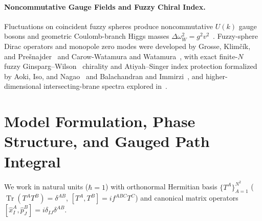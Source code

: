 \documentclass[11pt,a4paper]{article}
\DeclareMathOperator{\Tr}{Tr}
\begin{document}
\paragraph{Noncommutative Gauge Fields and Fuzzy Chiral Index.}
Fluctuations on coincident fuzzy spheres produce noncommutative $U(k)$ gauge bosons and geometric Coulomb-branch Higgs masses $\Delta\omega_W^2 = g^2 v^2$~\cite{Iso2001}. Fuzzy-sphere Dirac operators and monopole zero modes were developed by Grosse, Klim\v{c}\'ik, and Pre\v{s}najder~\cite{Grosse1996} and Carow-Watamura and Watamura~\cite{CarowWatamura1997}, with exact finite-$N$ fuzzy Ginsparg--Wilson~\cite{Ginsparg1982} chirality and Atiyah--Singer index protection formalized by Aoki, Iso, and Nagao~\cite{Aoki2003} and Balachandran and Immirzi~\cite{Balachandran2003}, and higher-dimensional intersecting-brane spectra explored in~\cite{Chatzistavrakidis2011}.

\section{Model Formulation, Phase Structure, and Gauged Path Integral}
\label{sec:model}

We work in natural units ($\hbar = 1$) with orthonormal Hermitian basis $\{T^A\}_{A=1}^{N^2}$ ($\Tr(T^A T^B)=\delta^{AB}$, $[T^A,T^B]=i f^{ABC}T^C$) and canonical matrix operators $[\hat{x}_I^A, \hat{p}_J^B] = i\delta_{IJ}\delta^{AB}$.
\end{document}
